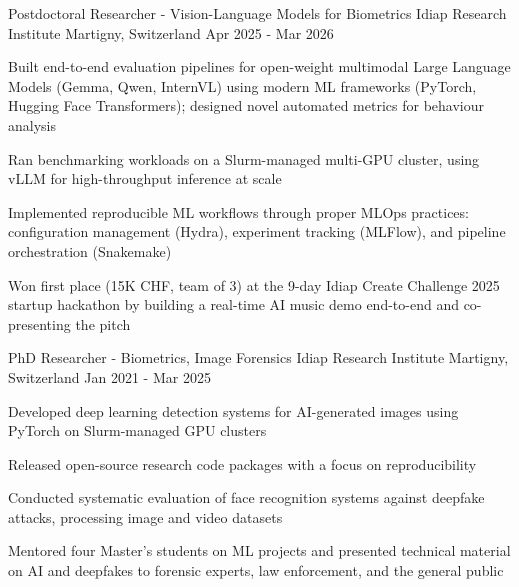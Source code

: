 

\begin{cventries}

\cventry
    {Postdoctoral Researcher - Vision-Language Models for Biometrics} %
    {Idiap Research Institute} %
    {Martigny, Switzerland} %
    {Apr 2025 - Mar 2026} %
    {
     \begin{cvitems} %
        \item {Built end-to-end evaluation pipelines for open-weight multimodal Large Language Models (Gemma, Qwen, InternVL) using modern ML frameworks (PyTorch, Hugging Face Transformers); designed novel automated metrics for behaviour analysis}
        \item {Ran benchmarking workloads on a Slurm-managed multi-GPU cluster, using vLLM for high-throughput inference at scale}
        \item {Implemented reproducible ML workflows through proper MLOps practices: configuration management (Hydra), experiment tracking (MLFlow), and pipeline orchestration (Snakemake)}
        \item {Won first place (15K CHF, team of 3) at the 9-day Idiap Create Challenge 2025 startup hackathon by building a real-time AI music demo end-to-end and co-presenting the pitch}
      \end{cvitems}
    }
    

  \cventry
    {PhD Researcher - Biometrics, Image Forensics} %
    {Idiap Research Institute} %
    {Martigny, Switzerland} %
    {Jan 2021 - Mar 2025} %
    {
      \begin{cvitems} %
        \item {Developed deep learning detection systems for AI-generated images using PyTorch on Slurm-managed GPU clusters}
        \item {Released open-source research code packages with a focus on reproducibility}
        \item {Conducted systematic evaluation of face recognition systems against deepfake attacks, processing image and video datasets}
        \item {Mentored four Master's students on ML projects and presented technical material on AI and deepfakes to forensic experts, law enforcement, and the general public}
      \end{cvitems}
    }


\end{cventries}
